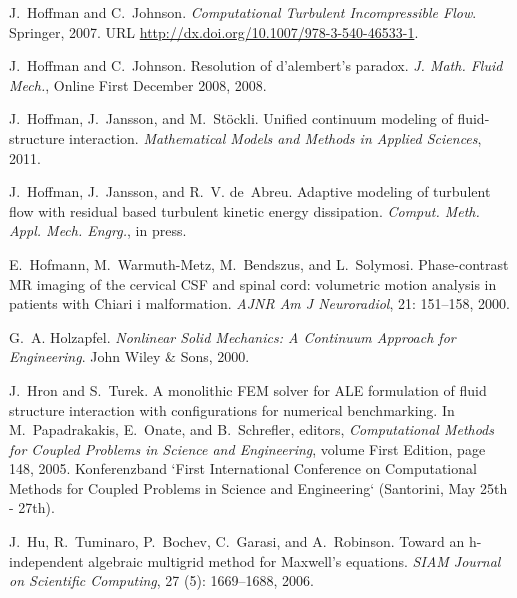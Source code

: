 \begin{thebibliography}{467}
J.~Hoffman and C.~Johnson.
\newblock \emph{Computational Turbulent Incompressible Flow}.
\newblock Springer, 2007.
\newblock URL \url{http://dx.doi.org/10.1007/978-3-540-46533-1}.

J.~Hoffman and C.~Johnson.
\newblock Resolution of d'alembert's paradox.
\newblock \emph{J. Math. Fluid Mech.}, Online First December 2008, 2008.

J.~Hoffman, J.~Jansson, and M.~St\"ockli.
\newblock Unified continuum modeling of fluid-structure interaction.
\newblock \emph{Mathematical Models and Methods in Applied Sciences}, 2011.

J.~Hoffman, J.~Jansson, and R.~V. de~Abreu.
\newblock Adaptive modeling of turbulent flow with residual based turbulent
  kinetic energy dissipation.
\newblock \emph{Comput. Meth. Appl. Mech. Engrg.}, in press.

E.~Hofmann, M.~Warmuth-Metz, M.~Bendszus, and L.~Solymosi.
\newblock Phase-contrast {MR} imaging of the cervical {CSF} and spinal cord:
  volumetric motion analysis in patients with {C}hiari i malformation.
\newblock \emph{AJNR Am J Neuroradiol}, 21: 151--158, 2000.

G.~A. Holzapfel.
\newblock \emph{Nonlinear Solid Mechanics: A Continuum Approach for
  Engineering}.
\newblock John Wiley \& Sons, 2000.

J.~Hron and S.~Turek.
\newblock A monolithic {FEM} solver for {ALE} formulation of fluid structure
  interaction with configurations for numerical benchmarking.
\newblock In M.~Papadrakakis, E.~Onate, and B.~Schrefler, editors,
  \emph{Computational Methods for Coupled Problems in Science and Engineering},
  volume First Edition, page 148, 2005.
\newblock Konferenzband `First International Conference on Computational
  Methods for Coupled Problems in Science and Engineering` (Santorini, May 25th
  - 27th).

J.~Hu, R.~Tuminaro, P.~Bochev, C.~Garasi, and A.~Robinson.
\newblock Toward an h-independent algebraic multigrid method for {M}axwell's
  equations.
\newblock \emph{SIAM Journal on Scientific Computing}, 27
  (5): 1669--1688, 2006.


\end{thebibliography}
